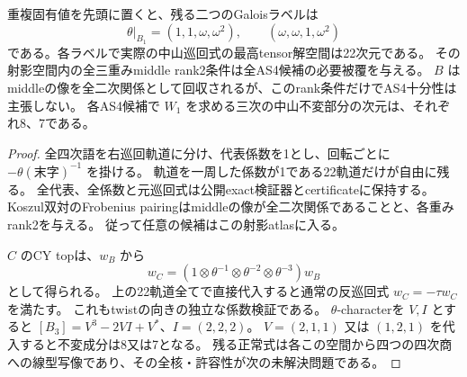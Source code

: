 \begin{proposition}
\label{prop:cubic-third-root-22-atlas}
重複固有値を先頭に置くと、残る二つのGaloisラベルは
\[
 \theta|_{B_1}=(1,1,\omega,\omega^2),\qquad
 (\omega,\omega,1,\omega^2)
\]
である。各ラベルで実際の中山巡回式の最高tensor解空間は22次元である。
その射影空間内の全三重みmiddle rank2条件は全AS4候補の必要被覆を与える。
$B$ はmiddleの像を全二次関係として回収されるが、このrank条件だけでAS4十分性は主張しない。
各AS4候補で $W_1$ を求める三次の中山不変部分の次元は、それぞれ8、7である。
\end{proposition}
\begin{proof}
全四次語を右巡回軌道に分け、代表係数を1とし、回転ごとに
$-\theta(\text{末字})^{-1}$ を掛ける。
軌道を一周した係数が1である22軌道だけが自由に残る。
全代表、全係数と元巡回式は公開exact検証器とcertificateに保持する。
Koszul双対のFrobenius pairingはmiddleの像が全二次関係であることと、各重みrank2を与える。
従って任意の候補はこの射影atlasに入る。

$C$ のCY topは、$w_B$ から
\[
 w_C=(1\otimes\theta^{-1}\otimes\theta^{-2}\otimes\theta^{-3})w_B
\]
として得られる。
上の22軌道全てで直接代入すると通常の反巡回式 $w_C=-\tau w_C$ を満たす。
これもtwistの向きの独立な係数検証である。
$\theta$-characterを $V,I$ とすると
$[B_3]=V^3-2VI+V^*$、$I=(2,2,2)$。
$V=(2,1,1)$ 又は $(1,2,1)$ を代入すると不変成分は8又は7となる。
残る正常式は各この空間から四つの四次商への線型写像であり、その全核・許容性が次の未解決問題である。
\end{proof}
